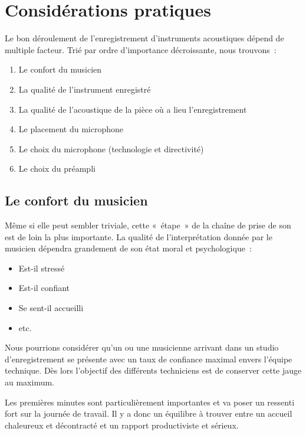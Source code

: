 \documentclass[
]{book}
\providecommand{\tightlist}{%
  \setlength{\itemsep}{0pt}\setlength{\parskip}{0pt}}
\begin{document}
\hypertarget{considuxe9rations-pratiques}{%
\chapter{Considérations pratiques}\label{considuxe9rations-pratiques}}

Le bon déroulement de l'enregistrement d'instruments acoustiques dépend de multiple facteur. Trié par ordre d'importance décroissante, nous trouvons~:

\begin{enumerate}
\def\labelenumi{\arabic{enumi}.}
\tightlist
\item
  Le confort du musicien
\item
  La qualité de l'instrument enregistré
\item
  La qualité de l'acoustique de la pièce où a lieu l'enregistrement
\item
  Le placement du microphone
\item
  Le choix du microphone (technologie et directivité)
\item
  Le choix du préampli
\end{enumerate}

\hypertarget{le-confort-du-musicien}{%
\section{Le confort du musicien}\label{le-confort-du-musicien}}

Même si elle peut sembler triviale, cette «~étape~» de la chaîne de prise de son est de loin la plus importante.
La qualité de l'interprétation donnée par le musicien dépendra grandement de son état moral et psychologique~:

\begin{itemize}
\tightlist
\item
  Est-il stressé
\item
  Est-il confiant
\item
  Se sent-il accueilli
\item
  etc.
\end{itemize}

Nous pourrions considérer qu'un ou une musicienne arrivant dans un studio d'enregistrement se présente avec un taux de confiance maximal envers l'équipe technique. Dès lors l'objectif des différents techniciens est de conserver cette jauge au maximum.

Les premières minutes sont particulièrement importantes et va poser un ressenti fort sur la journée de travail. Il y a donc un équilibre à trouver entre un accueil chaleureux et décontracté et un rapport productiviste et sérieux.
\end{document}

